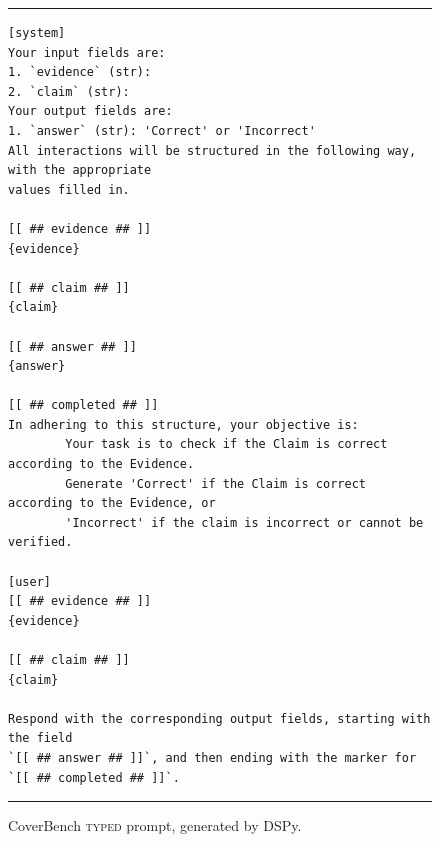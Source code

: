 \documentclass[11pt]{article}
\newcommand{\typed}{\textsc{typed}}
\begin{document}
\begin{figure}[H]
\centering
\begin{minipage}{0.92\textwidth}
\footnotesize
\hrule\vspace{4pt}
\begin{verbatim}
[system]
Your input fields are:
1. `evidence` (str):
2. `claim` (str):
Your output fields are:
1. `answer` (str): 'Correct' or 'Incorrect'
All interactions will be structured in the following way, with the appropriate
values filled in.

[[ ## evidence ## ]]
{evidence}

[[ ## claim ## ]]
{claim}

[[ ## answer ## ]]
{answer}

[[ ## completed ## ]]
In adhering to this structure, your objective is:
        Your task is to check if the Claim is correct according to the Evidence.
        Generate 'Correct' if the Claim is correct according to the Evidence, or
        'Incorrect' if the claim is incorrect or cannot be verified.

[user]
[[ ## evidence ## ]]
{evidence}

[[ ## claim ## ]]
{claim}

Respond with the corresponding output fields, starting with the field
`[[ ## answer ## ]]`, and then ending with the marker for `[[ ## completed ## ]]`.
\end{verbatim}
\vspace{2pt}\hrule
\end{minipage}
\caption{CoverBench \typed{} prompt, generated by DSPy.}
\label{fig:prompt_cb_typed}
\end{figure}
\end{document}
